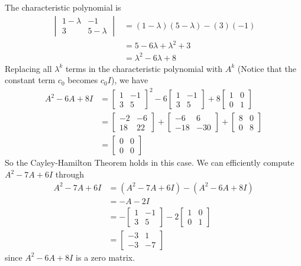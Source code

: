 \begin{solution}
The characteristic polynomial is
\begin{align*}
\begin{vmatrix}
1-\lambda & -1 \\
3 & 5-\lambda
\end{vmatrix}  
&= (1-\lambda)(5-\lambda) - (3)(-1) \\
&= 5 - 6 \lambda + \lambda^2 + 3 \\
&= \lambda^2 - 6\lambda + 8
\end{align*}
Replacing all $\lambda^k$ terms in the characteristic polynomial with $A^k$ (Notice that the constant term $c_0$ becomes $c_0 I$), we have
\begin{align*}
A^2 - 6A + 8I &= 
\begin{bmatrix}
1 & -1 \\
3 & 5
\end{bmatrix}^2
- 6
\begin{bmatrix}
1 & -1 \\
3 & 5
\end{bmatrix} 
+ 8
\begin{bmatrix}
1 & 0 \\
0 & 1
\end{bmatrix} \\
&=
\begin{bmatrix}
-2 & -6 \\
18 & 22
\end{bmatrix}
+
\begin{bmatrix}
-6 & 6 \\
-18 & -30
\end{bmatrix} 
+
\begin{bmatrix}
8 & 0 \\
0 & 8
\end{bmatrix} \\
&=
\begin{bmatrix}
0 & 0\\
0 & 0
\end{bmatrix}
\end{align*}
So the Cayley-Hamilton Theorem holds in this case. We can efficiently compute $A^2 - 7A + 6I$ through
\begin{align*}
A^2 - 7A + 6I &= (A^2 - 7A + 6I) - (A^2 - 6A + 8I) \\
&= -A-2I \\
&= -\begin{bmatrix}
1 & -1 \\
3 & 5
\end{bmatrix} 
-2
\begin{bmatrix}
1 & 0 \\
0 & 1
\end{bmatrix} \\
&=
\begin{bmatrix}
-3 & 1 \\
-3 & -7
\end{bmatrix}
\end{align*}
since $A^2 - 6A + 8I$ is a zero matrix.
\end{solution}

